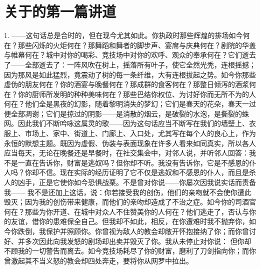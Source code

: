 
\chapter{关于的第一篇讲道}


\par

1. ——这句话总是合时的，但在现今尤其如此。你执政时那些辉煌的排场如今何在？那些闪烁的火炬何在？那舞蹈和舞者的脚步声、宴席与庆典何在？剧院的华盖与帷幕何在？城中对你的喝彩、竞技场中对你的欢呼、观众的奉承何在？它们逝去了——全部逝去了：一阵风吹在树上，摇落所有叶子，使它全然光秃，连根摇撼；因为那风是如此猛烈，竟震动了树的每一条纤维，大有连根拔起之势。如今你那些虚伪的朋友何在？你的酒宴与晚餐何在？那成群的食客何在？那整日倾泻的酒浆何在？你的厨师所发明的种种美味何在？那些巴结你权位、为讨好你而无所不为的人何在？他们全是黑夜的幻影，随着黎明消失的梦幻；它们是春天的花朵，春天一过便全部凋谢；它们是掠过的阴影——是消散的烟云，是破裂的水泡，是撕裂的蛛网。因此我们不断吟咏这属灵的歌——因为这句话应当不断写在我们的墙壁上、衣服上、市场上、家中、街道上、门廊上、入口处，尤其写在每个人的良心上，作为永恒的默想主题。既因为虚假、伪装与表面现象在许多人看来如同真实，所以各人应当每天，无论在晚餐还是早餐时，在社交集会中，对邻人说，并听邻人回答：我不是一直在告诉你，财富是逃奴吗？但你却不听。我没有告诉你，它是不感恩的仆人吗？你却不信。现在实际的经历证明了它不仅是逃奴和不感恩的仆人，而且是杀人的凶手，正是它使你如今恐惧战栗。不是曾对你说——你屡次因我说实话而责备我—— 我不是还加上这话，说：你若接受我的创伤，他们的亲吻就不会使你遭此毁灭；因为我的创伤带来健康，而他们的亲吻却造成了不治之症。如今你的司酒官何在？那些为你开道、在城中对众人不住赞美你的人何在？他们逃走了，否认与你的友谊，借你的患难保全自己。但我却不如此，相反，在你遭难时我不抛弃你，如今你跌倒，我保护并照顾你。你曾视为敌人的教会却敞开怀抱接纳了你；而你曾讨好、并多次因此向我发怒的剧场却出卖并毁灭了你。我从未停止对你说： 但你却不顾我的一切警告而离去。如今竞技场耗尽了你的财富，磨利了刀剑指向你；而你曾激起其不当义怒的教会却四处奔走，要将你从网罗中拉出。\par

